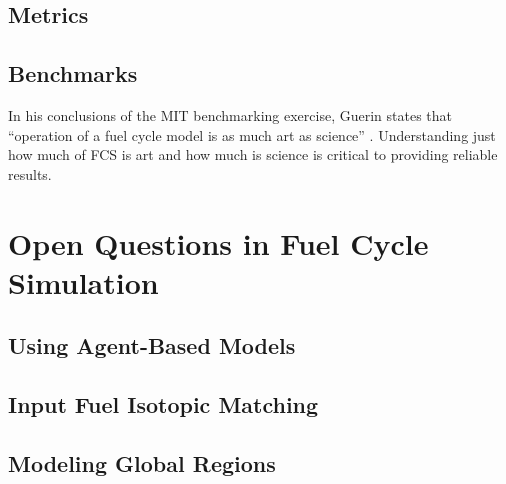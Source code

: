 \subsection{Metrics}

\subsection{Benchmarks}

In his conclusions of the MIT benchmarking exercise, Guerin states that
``operation of a fuel cycle model is as much art as science''
\cite{guerin_benchmark_2009}. Understanding just how much of FCS is art and how
much is science is critical to providing reliable results. 

\section{Open Questions in Fuel Cycle Simulation}


\subsection{Using Agent-Based Models}

\subsection{Input Fuel Isotopic Matching}

\subsection{Modeling Global Regions}
